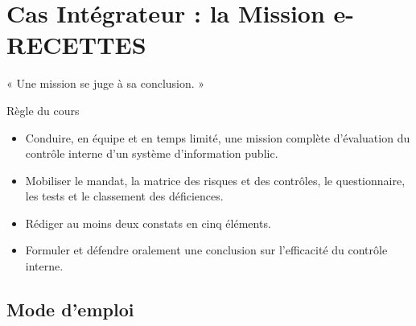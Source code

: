
\chapter{Cas Intégrateur : la Mission e-RECETTES}
\label{chap:cas-integrateur}

\epigraph{%
    « Une mission se juge à sa conclusion. »%
}{Règle du cours}


\begin{boxobjectifs}
\begin{itemize}
    \item Conduire, en équipe et en temps limité, une mission complète
          d'évaluation du contrôle interne d'un système d'information
          public.
    \item Mobiliser le mandat, la matrice des risques et des contrôles, le
          questionnaire, les tests et le classement des déficiences.
    \item Rédiger au moins deux constats en cinq éléments.
    \item Formuler et défendre oralement une conclusion sur l'efficacité du
          contrôle interne.
\end{itemize}
\end{boxobjectifs}

\bigskip

\section*{Mode d'emploi}


